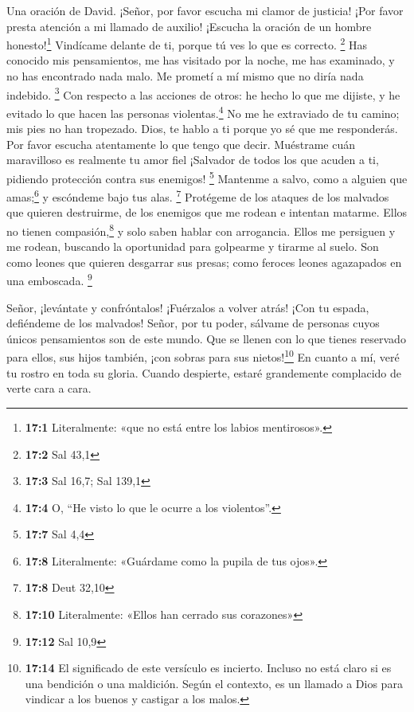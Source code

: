 Una oración de David.  ¡Señor, por favor escucha mi clamor
de justicia! ¡Por favor presta atención a mi llamado de auxilio!
¡Escucha la oración de un hombre honesto!\footnote{\textbf{17:1}
  Literalmente: «que no está entre los labios mentirosos».}
 Vindícame delante de ti, porque tú ves lo que es
correcto. \footnote{\textbf{17:2} Sal 43,1}  Has conocido
mis pensamientos, me has visitado por la noche, me has examinado, y no
has encontrado nada malo. Me prometí a mí mismo que no diría nada
indebido. \footnote{\textbf{17:3} Sal 16,7; Sal 139,1} 
Con respecto a las acciones de otros: he hecho lo que me dijiste, y he
evitado lo que hacen las personas violentas.\footnote{\textbf{17:4} O,
  ``He visto lo que le ocurre a los violentos''.}  No me
he extraviado de tu camino; mis pies no han tropezado. 
Dios, te hablo a ti porque yo sé que me responderás. Por favor escucha
atentamente lo que tengo que decir.  Muéstrame cuán
maravilloso es realmente tu amor fiel ¡Salvador de todos los que acuden
a ti, pidiendo protección contra sus enemigos! \footnote{\textbf{17:7}
  Sal 4,4}  Mantenme a salvo, como a alguien que
amas;\footnote{\textbf{17:8} Literalmente: «Guárdame como la pupila de
  tus ojos».} y escóndeme bajo tus alas. \footnote{\textbf{17:8} Deut
  32,10}  Protégeme de los ataques de los malvados que
quieren destruirme, de los enemigos que me rodean e intentan matarme.
 Ellos no tienen compasión,\footnote{\textbf{17:10}
  Literalmente: «Ellos han cerrado sus corazones»} y solo saben hablar
con arrogancia.  Ellos me persiguen y me rodean, buscando
la oportunidad para golpearme y tirarme al suelo.  Son
como leones que quieren desgarrar sus presas; como feroces leones
agazapados en una emboscada. \footnote{\textbf{17:12} Sal 10,9}

 Señor, ¡levántate y confróntalos! ¡Fuérzalos a volver
atrás! ¡Con tu espada, defiéndeme de los malvados! 
Señor, por tu poder, sálvame de personas cuyos únicos pensamientos son
de este mundo. Que se llenen con lo que tienes reservado para ellos, sus
hijos también, ¡con sobras para sus nietos!\footnote{\textbf{17:14} El
  significado de este versículo es incierto. Incluso no está claro si es
  una bendición o una maldición. Según el contexto, es un llamado a Dios
  para vindicar a los buenos y castigar a los malos.}  En
cuanto a mí, veré tu rostro en toda su gloria. Cuando despierte, estaré
grandemente complacido de verte cara a cara.

